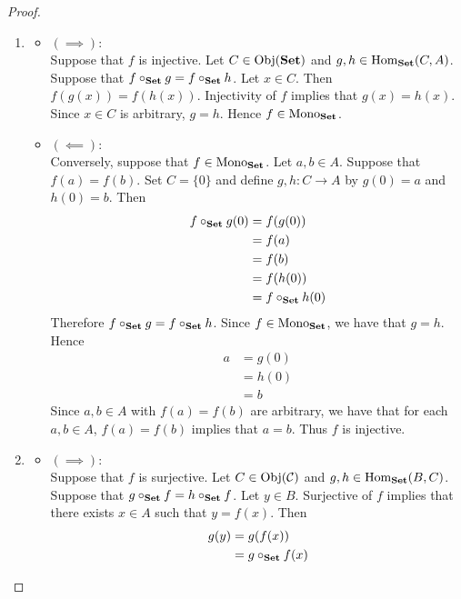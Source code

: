 \documentclass{book}
\begin{document}
	\begin{proof}\
		\begin{enumerate}
			\item 
			\begin{itemize}
				\item $(\implies)$: \\
				Suppose that $f$ is injective. Let $C \in \operatorname{Obj}(\text{\textbf{Set}})$ and $g,h \in \operatorname{Hom}_{\text{\textbf{Set}}}(C, A)$. Suppose that $f \circ_{\text{\textbf{Set}}} g = f \circ_{\text{\textbf{Set}}} h$. Let $x \in C$. Then $f(g(x)) = f(h(x))$. Injectivity of $f$ implies that $g(x) = h(x)$. Since $x \in C$ is arbitrary, $g = h$. Hence $f \in \operatorname{Mono}_{\text{\textbf{Set}}}$. \\
				\item $(\impliedby)$: \\
				Conversely, suppose that $f \in \operatorname{Mono}_{\text{\textbf{Set}}}$. Let $a, b \in A$. Suppose that $f(a) = f(b)$. Set $C = \{0\}$ and define $g,h: C \rightarrow A$ by $g(0) = a$ and $h(0) = b$. Then  
				\begin{align*}
					f \circ_{\text{\textbf{Set}}} g(0) 
					& = f(g(0)) \\
					& = f(a) \\
					& = f(b) \\
					& = f(h(0)) \\
					& = f \circ_{\text{\textbf{Set}}} h(0) 
				\end{align*}
				Therefore $f \circ_{\text{\textbf{Set}}} g = f \circ_{\text{\textbf{Set}}} h$. Since $f \in \operatorname{Mono}_{\text{\textbf{Set}}}$, we have that $g = h$. Hence 
				\begin{align*}
					a 
					& = g(0) \\
					& = h(0) \\
					& = b
				\end{align*}
				Since $a, b \in A$ with $f(a) = f(b)$ are arbitrary, we have that for each $a, b \in A$, $f(a) = f(b)$ implies that $a = b$. Thus $f$ is injective.
			\end{itemize}
			\item 
			\begin{itemize}
				\item $(\implies)$: \\
				Suppose that $f$ is surjective. Let $C \in \operatorname{Obj}(\mathcal{C})$ and $g,h \in \operatorname{Hom}_{\text{\textbf{Set}}}(B, C)$. Suppose that $g \circ_{\text{\textbf{Set}}} f = h \circ_{\text{\textbf{Set}}} f$. Let $y \in B$. Surjective of $f$ implies that there exists $x \in A$ such that $y = f(x)$. 
				Then 
				\begin{align*}
					g(y)
					& = g(f(x)) \\
					& = g \circ_{\bSet} f (x) \\

\end{align*}
\end{itemize}
\end{enumerate}
\end{proof}
\end{document}

